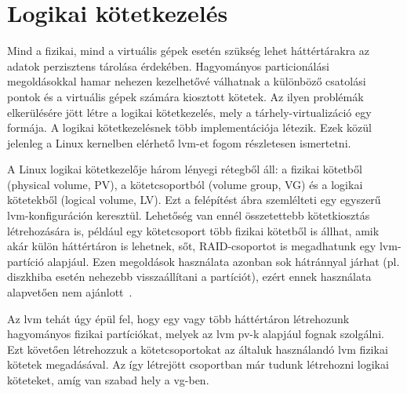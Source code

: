 \section{Logikai kötetkezelés}
Mind a fizikai, mind a virtuális gépek esetén szükség lehet háttértárakra az adatok perzisztens tárolása érdekében. Hagyományos particionálási megoldásokkal hamar nehezen kezelhetővé válhatnak a különböző csatolási pontok és a virtuális gépek számára kiosztott kötetek. Az ilyen problémák elkerülésére jött létre a logikai kötetkezelés, mely a tárhely-virtualizáció egy formája. A logikai kötetkezelésnek több implementációja létezik. %
Ezek közül jelenleg a Linux kernelben elérhető \gls{lvm}-et fogom részletesen ismertetni.

A Linux logikai kötetkezelője három lényegi rétegből áll: a fizikai kötetből (physical volume, PV), a kötetcsoportból (volume group, VG) és a logikai kötetekből (logical volume, LV). Ezt a felépítést  ábra szemlélteti egy egyszerű \gls{lvm}-konfiguráción keresztül.
Lehetőség van ennél összetettebb kötetkiosztás létrehozására is, például egy kötetcsoport több fizikai kötetből is állhat, amik akár külön háttértáron is lehetnek, sőt, RAID-csoportot is megadhatunk egy \gls{lvm}-partíció alapjául. Ezen megoldások használata azonban sok hátránnyal járhat (pl. diszkhiba esetén nehezebb visszaállítani a partíciót), ezért ennek használata alapvetően nem ajánlott~\cite{RHLVM}.

Az \gls{lvm} tehát úgy épül fel, hogy egy vagy több háttértáron létrehozunk hagyományos fizikai partíciókat, melyek az \gls{lvm} \acrshort{pv}-k alapjául fognak szolgálni. Ezt követően létrehozzuk a kötetcsoportokat az általuk használandó \acrshort{lvm} fizikai kötetek megadásával. Az így létrejött csoportban már tudunk létrehozni logikai köteteket, amíg van szabad hely a \acrshort{vg}-ben.


